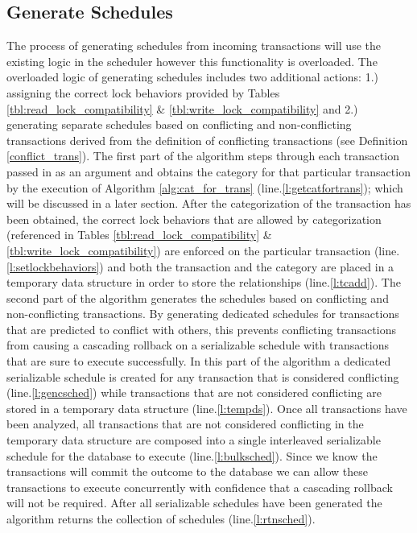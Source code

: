 \documentclass[conference]{IEEEtran}
\begin{document}
\subsection{Generate Schedules}
The process of generating schedules from incoming transactions will use the existing logic in the scheduler however this functionality is overloaded. The overloaded logic of generating schedules includes two additional actions: 1.) assigning the correct lock behaviors provided by Tables \ref{tbl:read_lock_compatibility} \& \ref{tbl:write_lock_compatibility} and 2.) generating separate schedules based on conflicting and non-conflicting transactions derived from the definition of conflicting transactions (see Definition \ref{conflict_trans}). The first part of the algorithm steps through each transaction passed in as an argument and obtains the category for that particular transaction by the execution of Algorithm \ref{alg:cat_for_trans} (line.\ref{l:getcatfortrans}); which will be discussed in a later section. After the categorization of the transaction has been obtained, the correct lock behaviors that are allowed by categorization (referenced in Tables \ref{tbl:read_lock_compatibility} \& \ref{tbl:write_lock_compatibility}) are enforced on the particular transaction (line.\ref{l:setlockbehaviors}) and both the transaction and the category are placed in a temporary data structure in order to store the relationships (line.\ref{l:tcadd}). The second part of the algorithm generates the schedules based on conflicting and non-conflicting transactions. By generating dedicated schedules for transactions that are predicted to conflict with others, this prevents conflicting transactions from causing a cascading rollback on a serializable schedule with transactions that are sure to execute successfully. In this part of the algorithm a dedicated serializable schedule is created for any transaction that is considered conflicting (line.\ref{l:gencsched}) while transactions that are not considered conflicting are stored in a temporary data structure (line.\ref{l:tempds}). Once all transactions have been analyzed, all transactions that are not considered conflicting in the temporary data structure are composed into a single interleaved serializable schedule for the database to execute (line.\ref{l:bulksched}). Since we know the transactions will commit the outcome to the database we can allow these transactions to execute concurrently with confidence that a cascading rollback will not be required. After all serializable schedules have been generated the algorithm returns the collection of schedules (line.\ref{l:rtnsched}).
\end{document}
